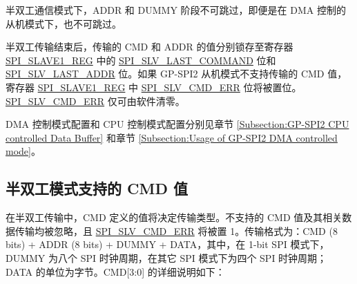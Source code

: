 \documentclass[main\_\_CN.tex]{subfiles}
\begin{document}
半双工通信模式下，ADDR 和 DUMMY 阶段不可跳过，即便是在 DMA 控制的从机模式下，也不可跳过。

半双工传输结束后，传输的 CMD 和 ADDR 的值分别锁存至寄存器 \hyperref[regdesc:SPISLAVE1REG]{SPI\_SLAVE1\_REG} 中的 \hyperref[fielddesc:SPISLVLASTCOMMAND]{SPI\_SLV\_LAST\_COMMAND} 位和 \hyperref[fielddesc:SPISLVLASTADDR]{SPI\_SLV\_LAST\_ADDR} 位。如果 GP-SPI2 从机模式不支持传输的 CMD 值，寄存器 \hyperref[regdesc:SPISLAVE1REG]{SPI\_SLAVE1\_REG} 中 \hyperref[fielddesc:SPISLVCMDERR]{SPI\_SLV\_CMD\_ERR} 位将被置位。\hyperref[fielddesc:SPISLVCMDERR]{SPI\_SLV\_CMD\_ERR} 仅可由软件清零。

DMA 控制模式配置和 CPU 控制模式配置分别见章节 \ref{Subsection:GP-SPI2 CPU controlled Data Buffer} 和章节 \ref{Subsection:Usage of GP-SPI2 DMA controlled mode}。

\subsection{半双工模式支持的 CMD 值} \label{GP-SPI2 HD salve format}

在半双工传输中，CMD 定义的值将决定传输类型。不支持的 CMD 值及其相关数据传输均被忽略，且 \hyperref[fielddesc:SPISLVCMDERR]{SPI\_SLV\_CMD\_ERR} 将被置 1。传输格式为：CMD (8 bits) + ADDR (8 bits) + DUMMY + DATA，其中，在 1-bit SPI 模式下，DUMMY 为八个 SPI 时钟周期，在其它 SPI 模式下为四个 SPI 时钟周期；DATA 的单位为字节。CMD[3:0] 的详细说明如下：
\end{document}
